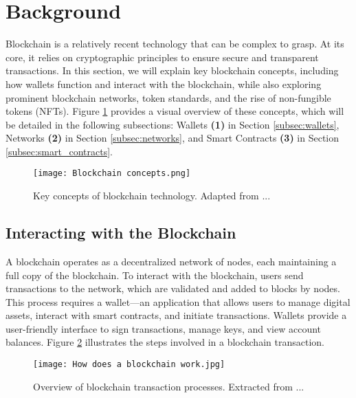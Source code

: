 \section{Background}
\label{sec:background}

Blockchain is a relatively recent technology that can be complex to grasp. At
its core, it relies on cryptographic principles to ensure secure and
transparent transactions. In this section, we will explain key blockchain
concepts, including how wallets function and interact with the blockchain,
while also exploring prominent blockchain networks, token standards, and the
rise of non-fungible tokens (NFTs). Figure \ref{fig:blockchain_concepts}
provides a visual overview of these concepts, which will be detailed in the
following subsections: Wallets \textbf{(1)} in Section \ref{subsec:wallets},
Networks \textbf{(2)} in Section \ref{subsec:networks}, and Smart Contracts
\textbf{(3)} in Section \ref{subsec:smart_contracts}.

\begin{figure}[H]
    \centering
    \texttt{[image: Blockchain concepts.png]}
    \caption[Blockchain concepts]{Key concepts of blockchain technology. Adapted from ...}
    \label{fig:blockchain_concepts}
\end{figure}

\subsection{Interacting with the Blockchain}
\label{subsec:interacting_with_the_blockchain}

A blockchain operates as a decentralized network of nodes, each maintaining a
full copy of the blockchain. To interact with the blockchain, users send
transactions to the network, which are validated and added to blocks by nodes.
This process requires a wallet—an application that allows users to manage
digital assets, interact with smart contracts, and initiate transactions.
Wallets provide a user-friendly interface to sign transactions, manage keys,
and view account balances. Figure \ref{fig:how_does_a_blockchain_work}
illustrates the steps involved in a blockchain transaction.

\begin{figure}[H]
    \centering
    \texttt{[image: How does a blockchain work.jpg]}
    \caption[Blockchain transaction process]{Overview of blockchain transaction processes. Extracted from ...}
    \label{fig:how_does_a_blockchain_work}
\end{figure}

